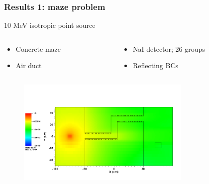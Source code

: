 \documentclass[handout]{beamer}
\renewcommand{\(}{\begin{columns}}
\renewcommand{\)}{\end{columns}}
\newcommand{\<}[1]{\begin{column}{#1}}
\renewcommand{\>}{\end{column}}
\begin{document}
\begin{frame}[fragile]

  \frametitle{Results 1: maze problem}
  10 MeV isotropic point source
  \begin{columns}
   \begin{column}{0.45\textwidth}
   \begin{itemize}
\item Concrete maze
\item Air duct
\end{itemize}
   \end{column}
  \begin{column}{0.5\textwidth}
   \begin{itemize}
\item NaI detector; 26 groups
\item Reflecting BCs
\end{itemize}
   \end{column}
\end{columns}
   \begin{figure}
   \includegraphics[height=2in,clip]{maze2_forward_group00_adjusted.png}
   \end{figure}


	
\end{frame}
\end{document}

